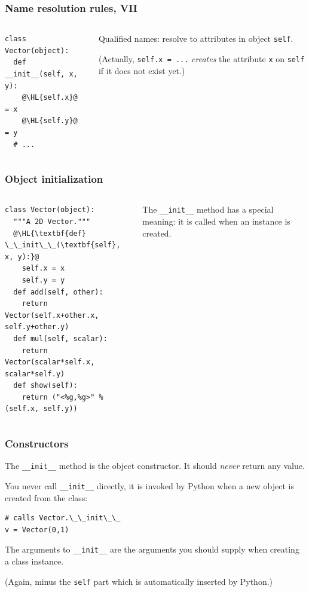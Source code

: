 \documentclass[english,serif,mathserif,xcolor=pdftex,dvipsnames,table]{beamer}
\begin{document}
\begin{frame}[fragile]
  \frametitle{Name resolution rules, VII}
  \begin{columns}
    \begin{column}[t]{0.6\linewidth}
\begin{lstlisting}
class Vector(object):
  def __init__(self, x, y):
    @\HL{self.x}@ = x
    @\HL{self.y}@ = y
  # ...
\end{lstlisting}
    \end{column}
    \begin{column}[t]{0.4\linewidth}
      \raggedleft
      Qualified names: resolve to attributes in object \lstinline|self|.

      \+ (Actually, \lstinline|self.x = ...| \emph{creates} the
      attribute \lstinline|x| on \lstinline|self| if it does not exist
      yet.)
    \end{column}
  \end{columns}

\end{frame}


\begin{frame}[fragile]
  \frametitle{Object initialization}
  \begin{columns}[t]
    \begin{column}{0.5\textwidth}
\begin{lstlisting}
class Vector(object):
  """A 2D Vector."""
  @\HL{\textbf{def} \_\_init\_\_(\textbf{self}, x, y):}@
    self.x = x
    self.y = y
  def add(self, other):
    return Vector(self.x+other.x, self.y+other.y)
  def mul(self, scalar):
    return Vector(scalar*self.x, scalar*self.y)
  def show(self):
    return ("<%g,%g>" % (self.x, self.y))
\end{lstlisting}
    \end{column}
    \begin{column}{0.5\textwidth}
      \raggedleft
      The \lstinline|__init__| method has a special
      meaning: it is called when an instance is created.
    \end{column}
  \end{columns}
\end{frame}



\begin{frame}[fragile]
  \frametitle{Constructors}

  The \lstinline|__init__| method is the object constructor.
  It should \emph{never} return any value.

  \+
  You never call \lstinline|__init__| directly, it is invoked by
  Python when a new object is created from the class:
\begin{lstlisting}
# calls Vector.\_\_init\_\_
v = Vector(0,1)
\end{lstlisting}

  \+
  The arguments to \lstinline|__init__| are the arguments you
  should supply when creating a class instance.

  \+
  (Again, minus the \texttt{self} part which is automatically
  inserted by Python.)
\end{frame}
\end{document}

